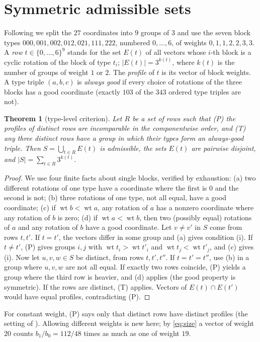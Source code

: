 \documentclass[11pt]{article}
\numberwithin{equation}{section}
\newtheorem{theorem}{Theorem}[section]
\theoremstyle{definition}
\theoremstyle{remark}
\DeclareMathOperator{\wt}{wt}
\begin{document}
\section{Symmetric admissible sets}
Following \cite{FunSearch} we split the $27$ coordinates into $9$ groups of $3$ and use the seven block
types $000,001,002,012,021,111,222$, numbered $0,\dots,6$, of weights $0,1,1,2,2,3,3$.  A \emph{row}
$t\in\{0,\dots,6\}^9$ stands for the set $E(t)$ of all vectors whose $i$-th block is a cyclic rotation
of the block of type $t_i$; $|E(t)|=3^{k(t)}$, where $k(t)$ is the number of groups of weight $1$ or
$2$.  The \emph{profile} of $t$ is its vector of block weights.  A type triple $(a,b,c)$ is
\emph{always good} if every choice of rotations of the three blocks has a good coordinate (exactly
$103$ of the $343$ ordered type triples are not).
\begin{theorem}[type-level criterion]\label{thm:red}
Let $R$ be a set of rows such that
\textup{(P)} the profiles of distinct rows are incomparable in the componentwise order, and
\textup{(T)} any three distinct rows have a group in which their types form an always-good triple.
Then $S=\bigcup_{t\in R}E(t)$ is admissible, the sets $E(t)$ are pairwise disjoint, and
$|S|=\sum_{t\in R}3^{k(t)}$.
\end{theorem}
\begin{proof}
We use four finite facts about single blocks, verified by exhaustion:
(a) two different rotations of one type have a coordinate where the first is $0$ and the second is not;
(b) three rotations of one type, not all equal, have a good coordinate;
(c) if $\wt b<\wt a$, any rotation of $a$ has a nonzero coordinate where any rotation of $b$ is zero;
(d) if $\wt a<\wt b$, then two (possibly equal) rotations of $a$ and any rotation of $b$ have a good coordinate.
Let $v\ne v'$ in $S$ come from rows $t,t'$.  If $t=t'$, the vectors differ in some group and (a) gives
condition (i).  If $t\ne t'$, (P) gives groups $i,j$ with $\wt t_i>\wt t'_i$ and $\wt t_j<\wt t'_j$,
and (c) gives (i).  Now let $u,v,w\in S$ be distinct, from rows $t,t',t''$.  If $t=t'=t''$, use (b)
in a group where $u,v,w$ are not all equal.  If exactly two rows coincide, (P) yields a group where the
third row is heavier, and (d) applies (the good property is symmetric).  If the rows are distinct,
(T) applies.  Vectors of $E(t)\cap E(t')$ would have equal profiles, contradicting (P).
\end{proof}
For constant weight, (P) says only that distinct rows have distinct profiles (the setting of
\cite{FunSearch,Xevolve}).  Allowing different weights is new here; by \eqref{eq:size} a vector of
weight $20$ counts $b_1/b_0=112/48$ times as much as one of weight $19$.
\end{document}
